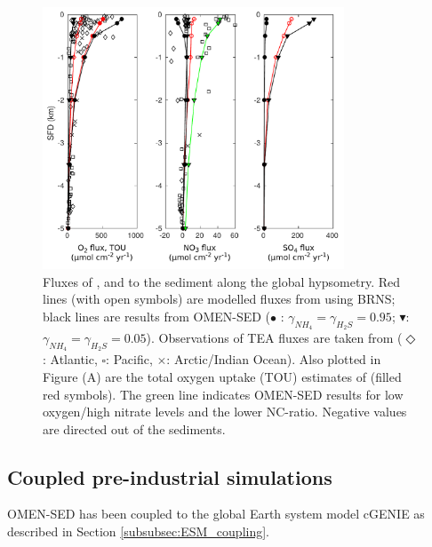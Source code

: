 \documentclass[gmd, manuscript]{copernicus}
\begin{document}
\begin{figure}[htbp]
\begin{center}
	\includegraphics[width=0.8\textwidth]{figures/0_OMEN_Thullner_hypsometry_fluxes_diff_NCratio.pdf}
	\caption{Fluxes of ,  and  to the sediment along the global hypsometry. 
	Red lines (with open symbols) are modelled fluxes from \citet{thullner_global_scale_2009} using BRNS; black lines are results from OMEN-SED ($\bullet$ : $\gamma_{NH_4}=\gamma_{H_2S}=0.95$; 
	$\blacktriangledown$: $\gamma_{NH_4}=\gamma_{H_2S}=0.05$). 
	Observations of TEA fluxes are taken from \citet{middelburg_denitrification_1996} ($\Diamond$: Atlantic, $\square$: Pacific, $\times$: Arctic/Indian Ocean). 
	Also plotted in Figure (A) are the total oxygen uptake (TOU) estimates of \citet{thullner_global_scale_2009} (filled red symbols). The green line indicates OMEN-SED results for low oxygen/high nitrate levels and the lower 
	NC-ratio. Negative values are directed out of the sediments.
	}\label{fig:hypsometry}
\end{center}
\end{figure}

\subsection{Coupled pre-industrial simulations}\label{subsec:GENIE-pre-ind}
OMEN-SED has been coupled to the global Earth system model cGENIE as described in Section \ref{subsubsec:ESM_coupling}. 
\end{document}
